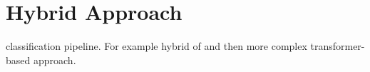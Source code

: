 \section{Hybrid Approach}
\label{chp:future_work:sec:hybrid_approach}

classification pipeline. For example hybrid of \textcite{Femmer:2017} and then more complex transformer-based approach.
